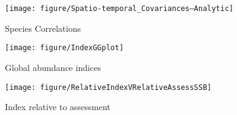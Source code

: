 \documentclass[11pt]{article}
\begin{document}
\begin{figure}[!phtb]
	\centering
\texttt{[image: figure/Spatio-temporal\_Covariances--Analytic]}
\caption{Species Correlations}
\label{fig:8}
\end{figure}

\begin{landscape}

\begin{figure}[!phtb]
	\centering
\texttt{[image: figure/IndexGGplot]}
\caption{Global abundance indices}
\label{fig:13}
\end{figure}

\end{landscape}

\begin{figure}[!phtb]
	\centering
\texttt{[image: figure/RelativeIndexVRelativeAssessSSB]}
\caption{Index relative to assessment}
\label{fig:14}
\end{figure}

\end{document}
